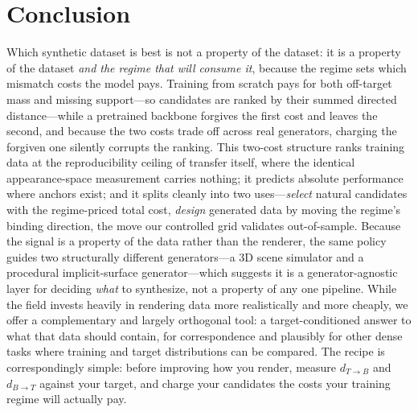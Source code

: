 \documentclass[runningheads]{llncs}
\newcommand{\dtb}{d_{T\to B}}
\newcommand{\dbt}{d_{B\to T}}
\begin{document}
\section{Conclusion}
\label{sec:conclusion}

Which synthetic dataset is best is not a property of the dataset: it is a
property of the dataset \emph{and the regime that will consume it}, because
the regime sets which mismatch costs the model pays. Training from scratch
pays for both off-target mass and missing support---so candidates are ranked
by their summed directed distance---while a pretrained backbone forgives the
first cost and leaves the second, and because the two costs trade off across
real generators, charging the forgiven one silently corrupts the ranking.
This two-cost structure ranks training data at the reproducibility ceiling
of transfer itself, where the identical appearance-space measurement carries
nothing; it predicts absolute performance where anchors exist; and it splits
cleanly into two uses---\emph{select} natural candidates with the
regime-priced total cost, \emph{design} generated data by moving the
regime's binding direction, the move our controlled grid validates
out-of-sample. Because the signal is a property of the data rather than the
renderer, the same policy guides two structurally different generators---a
3D scene simulator and a procedural implicit-surface generator---which
suggests it is a generator-agnostic layer for deciding \emph{what} to
synthesize, not a property of any one pipeline. While the field invests
heavily in rendering data more realistically and more cheaply, we offer a
complementary and largely orthogonal tool: a target-conditioned answer to
what that data should contain, for correspondence and plausibly for other
dense tasks where training and target distributions can be compared. The
recipe is correspondingly simple: before improving how you render, measure
$\dtb$ and $\dbt$ against your target, and charge your candidates the costs
your training regime will actually pay.



\end{document}
